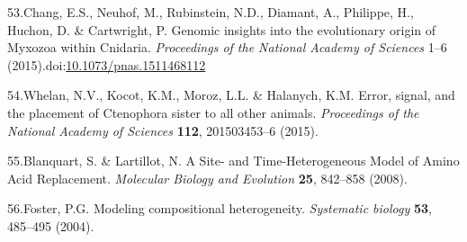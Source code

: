 \documentclass[]{article}
\begin{document}
\leavevmode\hypertarget{ref-Chang:2015hl}{}%
53.Chang, E.S., Neuhof, M., Rubinstein, N.D., Diamant, A., Philippe, H.,
Huchon, D. \& Cartwright, P. Genomic insights into the evolutionary
origin of Myxozoa within Cnidaria. \emph{Proceedings of the National
Academy of Sciences} 1--6
(2015).doi:\href{https://doi.org/10.1073/pnas.1511468112}{10.1073/pnas.1511468112}

\leavevmode\hypertarget{ref-Whelan:2015jj}{}%
54.Whelan, N.V., Kocot, K.M., Moroz, L.L. \& Halanych, K.M. Error,
signal, and the placement of Ctenophora sister to all other animals.
\emph{Proceedings of the National Academy of Sciences} \textbf{112},
201503453--6 (2015).

\leavevmode\hypertarget{ref-Blanquart:2008gl}{}%
55.Blanquart, S. \& Lartillot, N. A Site- and Time-Heterogeneous Model
of Amino Acid Replacement. \emph{Molecular Biology and Evolution}
\textbf{25}, 842--858 (2008).

\leavevmode\hypertarget{ref-Foster:2004tw}{}%
56.Foster, P.G. Modeling compositional heterogeneity. \emph{Systematic
biology} \textbf{53}, 485--495 (2004).
\end{document}
